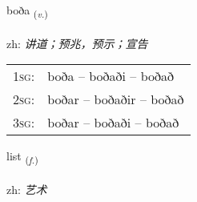 \documentclass[frontgrid, backgrid]{flacards}\usepackage[]{graphicx}\usepackage[]{color}
\begin{document}
\renewcommand{\flhead}{\vskip5pt \fboxsep=0pt {\small\bfseries\footnotesize Sagnorð | 动词}}
\renewcommand{\fcfoot}{\vskip5pt \fboxsep=0pt \hspace{2pt}{\small\bfseries\footnotesize 2K}}

\renewcommand{\blhead}{\vskip5pt {\small\bfseries\footnotesize Sagnorð | 动词 }}
\renewcommand{\bcfoot}{\vskip5pt \hspace{2pt}{\small\bfseries\footnotesize 2K}}


{boða \small{\textsubscript{(\textit{v.})}} \\[1ex] %
\textphonetic{[pɔːða]} \\
zh: \emph{讲道；预兆，预示；宣告} \\  [2ex]
\renewcommand*{\arraystretch}{0.8}
\begin{tabular}{p{1cm}l}
\textsc{1sg}: & boða -- boðaði -- boðað \\ 
\textsc{2sg}: & boðar -- boðaðir -- boðað \\ 
\textsc{3sg}: & boðar -- boðaði -- boðað \\ 
\end{tabular}
}

\renewcommand{\flhead}{\vskip5pt \fboxsep=0pt {\small\bfseries\footnotesize Nafnorð | 名词}}
\renewcommand{\fcfoot}{\vskip5pt \fboxsep=0pt \hspace{2pt}{\small\bfseries\footnotesize 2K}}

\renewcommand{\blhead}{\vskip5pt {\small\bfseries\footnotesize Nafnorð | 名词 }}
\renewcommand{\bcfoot}{\vskip5pt \hspace{2pt}{\small\bfseries\footnotesize 2K}}


{list \small{\textsubscript{(\textit{f.})}} \\[1ex] %
\textphonetic{[lɪst]} \\
zh: \emph{艺术} \\  [2ex]
\renewcommand*{\arraystretch}{0.8}
}
\end{document}
